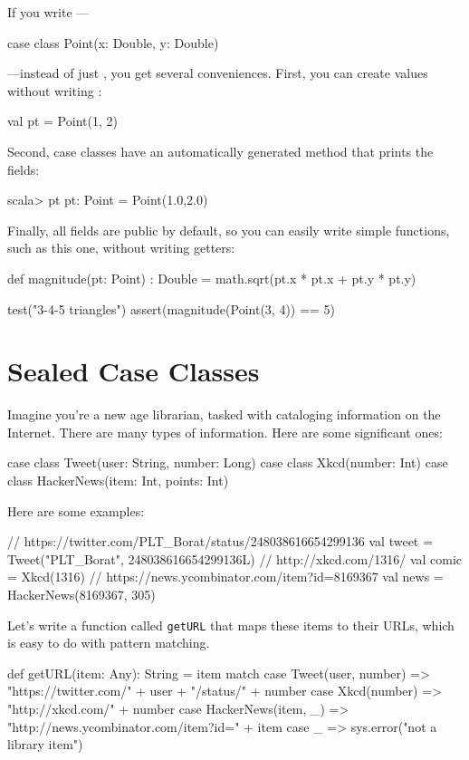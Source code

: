 \documentclass{book}
\begin{document}
If you write ---
%
\begin{scalacode}
case class Point(x: Double, y: Double)
\end{scalacode}
---instead of just , you get several conveniences.
First, you can create values without writing :
%
\begin{scalacode}
val pt = Point(1, 2)
\end{scalacode}
%
Second, case classes have an automatically generated 
method that prints the fields:
%
\begin{console}
scala> pt
pt: Point = Point(1.0,2.0)
\end{console}
%
Finally, all fields are public by default, so you can easily write simple
functions, such as this one, without writing getters:
%
\begin{scalacode}
def magnitude(pt: Point) : Double = {
  math.sqrt(pt.x * pt.x + pt.y * pt.y)
}

test("3-4-5 triangles") {
  assert(magnitude(Point(3, 4)) == 5)
}
\end{scalacode}

\section{Sealed Case Classes}

Imagine you're a new age librarian, tasked with cataloging information on the
Internet. There are many types of information. Here are some significant ones:

\begin{scalacode}
case class Tweet(user: String, number: Long)
case class Xkcd(number: Int)
case class HackerNews(item: Int, points: Int)
\end{scalacode}

Here are some examples:

\begin{scalacode}
// https://twitter.com/PLT_Borat/status/248038616654299136
val tweet = Tweet("PLT_Borat", 248038616654299136L)
// http://xkcd.com/1316/
val comic = Xkcd(1316)
// https://news.ycombinator.com/item?id=8169367
val news = HackerNews(8169367, 305)
\end{scalacode}

Let's write a function called \verb|getURL| that maps these items to their URLs,
which is easy to do with pattern matching.

\begin{scalacode}
def getURL(item: Any): String = item match {
  case Tweet(user, number) => "https://twitter.com/" + user + "/status/" + number
  case Xkcd(number) => "http://xkcd.com/" + number
  case HackerNews(item, _) => "http://news.ycombinator.com/item?id=" + item
  case _ => sys.error("not a library item")
}
\end{scalacode}
\end{document}
